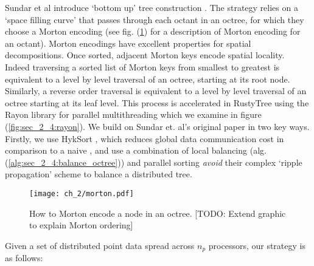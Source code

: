 Sundar et al introduce `bottom up' tree construction \cite{sundar2008bottom}. The strategy relies on a `space filling curve' that passes through each octant in an octree, for which they choose a Morton encoding (see fig. (\ref{fig:sec_2_4:morton}) for a description of Morton encoding for an octant). Morton encodings have excellent properties for spatial decompositions. Once sorted, adjacent Morton keys encode spatial locality. Indeed traversing a sorted list of Morton keys from smallest to greatest is equivalent to a level by level traversal of an octree, starting at its root node. Similarly, a reverse order traversal is equivalent to a level by level traversal of an octree starting at its leaf level. This process is accelerated in RustyTree using the Rayon library for parallel multithreading which we examine in figure (\ref{fig:sec_2_4:rayon}). We build on Sundar et. al's original paper in two key ways. Firstly, we use HykSort \cite{sundar2013hyksort}, which reduces global data communication cost in comparison to a naive , and use a combination of local balancing (alg. (\ref{alg:sec_2_4:balance_octree})) and parallel sorting \textit{avoid} their complex `ripple propagation' scheme to balance a distributed tree.

\begin{figure}
    \centerline{\texttt{[image: ch\_2/morton.pdf]}}
    \caption{How to Morton encode a node in an octree. [TODO: Extend graphic to explain Morton ordering]}
    \label{fig:sec_2_4:morton}
\end{figure}

Given a set of distributed point data spread across $n_p$ processors, our strategy is as follows:

